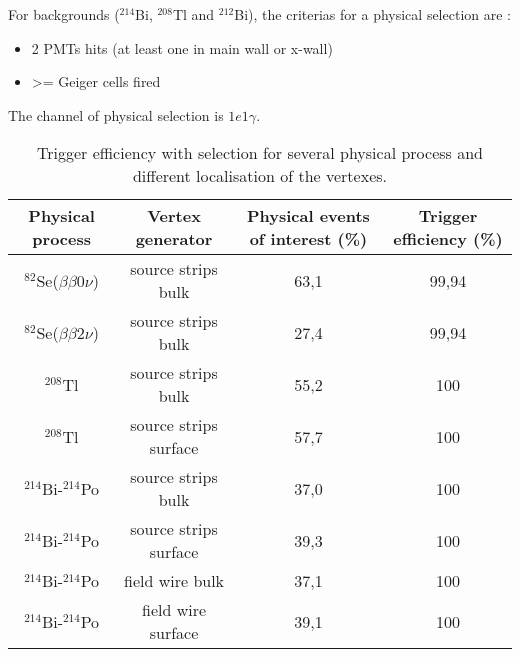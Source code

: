 \documentclass[12pt,a4paper]{article}
\newcommand{\BBZN}{$\beta\beta{}0\nu$}
\newcommand{\BBDN}{$\beta\beta{}2\nu$}
\newcommand{\SE}{$^{82}$Se}
\newcommand{\TL}{$^{208}$Tl}
\newcommand{\BIQ}{$^{214}$Bi}
\newcommand{\BID}{$^{212}$Bi}
\newcommand{\POQ}{$^{214}$Po}
\begin{document}
For backgrounds (\BIQ, \TL{} and \BID), the criterias for a physical selection are :
\begin{itemize}
 \item 2 PMTs hits (at least one in main wall or x-wall)
 \item >= Geiger cells fired
\end{itemize}
The channel of physical selection is $1e1\gamma$.

\begin{table}[!h]
 \begin{center}
  \begin{tabular}{|c||c|c|c|}
    \hline
    Physical process   & Vertex generator      & Physical events of interest (\%) & Trigger efficiency (\%)  \\
    \hline
    \SE(\BBZN)         & source strips bulk    & 63,1                             & 99,94                    \\
    \SE(\BBDN)         & source strips bulk    & 27,4                             & 99,94                    \\
    \TL                & source strips bulk    & 55,2                             & 100                      \\
    \TL                & source strips surface & 57,7                             & 100                      \\
    \BIQ-\POQ          & source strips bulk    & 37,0                             & 100                      \\
    \BIQ-\POQ          & source strips surface & 39,3                             & 100                      \\
    \BIQ-\POQ          & field wire bulk       & 37,1                             & 100                      \\
    \BIQ-\POQ          & field wire surface    & 39,1                             & 100                      \\
    \hline
  \end{tabular}
  \end{center}
  \caption{Trigger efficiency with selection for several physical process and different localisation of the vertexes.}
\label{poi_efficacity_trigger}
\end{table}
\end{document}
